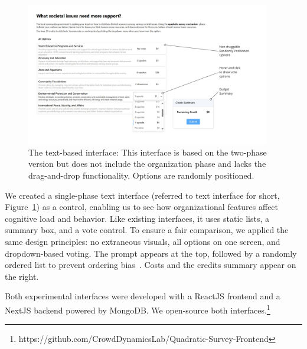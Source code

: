 \begin{figure}[!t]
    \centering
    \includegraphics[width=0.95\textwidth]{content/image/detailed_text.pdf}
    \caption{The text-based interface: This interface is based on the two-phase version but does not include the organization phase and lacks the drag-and-drop functionality. Options are randomly positioned.}
    \label{fig:textInterface}
\end{figure}

We created a single-phase text interface (referred to text interface for short, Figure~\ref{fig:textInterface}) as a control, enabling us to see how organizational features affect cognitive load and behavior. Like existing interfaces, it uses static lists, a summary box, and a vote control. To ensure a fair comparison, we applied the same design principles: no extraneous visuals, all options on one screen, and dropdown-based voting. The prompt appears at the top, followed by a randomly ordered list to prevent ordering bias~\cite{ferberOrderBiasMail1952, couperWebSurveyDesign2001}. Costs and the credits summary appear on the right.

Both experimental interfaces were developed with a ReactJS frontend and a NextJS backend powered by MongoDB. We open-source both interfaces.\footnote{https://github.com/CrowdDynamicsLab/Quadratic-Survey-Frontend}